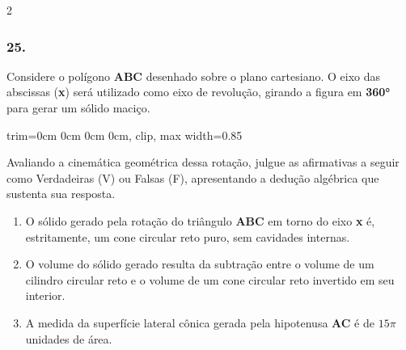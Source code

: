\documentclass[twoside, 10pt, a4paper]{article}
\newlength{\espacoQuestao}\setlength{\espacoQuestao}{0.2cm}
\newlength{\espacoAlt}\setlength{\espacoAlt}{0.2cm}
\newlength{\larguraTikz}
\begin{document}
\begin{multicols*}{2}
\subsubsection*{25.} Considere o polígono \textbf{ABC} desenhado sobre o plano cartesiano. O eixo das abscissas (\textbf{x}) será utilizado como eixo de revolução, girando a figura em \textbf{360°} para gerar um sólido maciço.

\begin{center}
\begin{adjustbox}{trim=0cm 0cm 0cm 0cm, clip, max width=0.85\larguraTikz}
\end{adjustbox}
\end{center}

Avaliando a cinemática geométrica dessa rotação, julgue as afirmativas a seguir como Verdadeiras (V) ou Falsas (F), apresentando a dedução algébrica que sustenta sua resposta.

\begin{enumerate}[label=\Roman*., itemsep=\espacoAlt]
\item O sólido gerado pela rotação do triângulo \textbf{ABC} em torno do eixo \textbf{x} é, estritamente, um cone circular reto puro, sem cavidades internas.
\item O volume do sólido gerado resulta da subtração entre o volume de um cilindro circular reto e o volume de um cone circular reto invertido em seu interior.
\item A medida da superfície lateral cônica gerada pela hipotenusa \textbf{AC} é de $ 15\pi $ unidades de área.
\end{enumerate}
\par\vspace{\espacoQuestao}


\end{multicols*}
\end{document}
